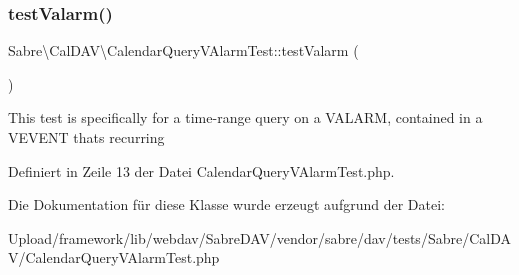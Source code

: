 \subsubsection{\texorpdfstring{test\+Valarm()}{testValarm()}}
{\footnotesize\ttfamily Sabre\textbackslash{}\+Cal\+D\+A\+V\textbackslash{}\+Calendar\+Query\+V\+Alarm\+Test\+::test\+Valarm (\begin{DoxyParamCaption}{ }\end{DoxyParamCaption})}

This test is specifically for a time-\/range query on a V\+A\+L\+A\+RM, contained in a V\+E\+V\+E\+NT that\textquotesingle{}s recurring 

Definiert in Zeile 13 der Datei Calendar\+Query\+V\+Alarm\+Test.\+php.



Die Dokumentation für diese Klasse wurde erzeugt aufgrund der Datei\+:\begin{DoxyCompactItemize}
\item 
Upload/framework/lib/webdav/\+Sabre\+D\+A\+V/vendor/sabre/dav/tests/\+Sabre/\+Cal\+D\+A\+V/Calendar\+Query\+V\+Alarm\+Test.\+php\end{DoxyCompactItemize}

